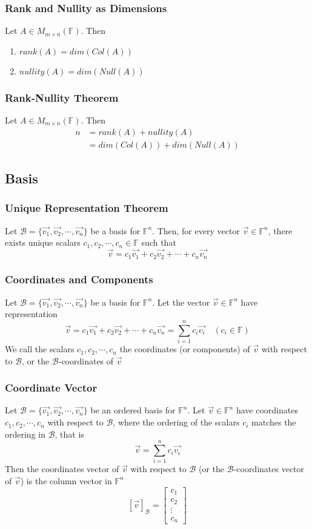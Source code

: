 \documentclass[12pt, letterpaper]{article}
\begin{document}
\subsubsection{Rank and Nullity as Dimensions}
Let $A\in M_{m\times n}(\mathbb{F})$. Then 
\begin{enumerate}
    \item $rank(A)=dim(Col(A))$
    \item $nullity(A)=dim(Null(A))$
\end{enumerate}
\subsubsection{Rank-Nullity Theorem}
Let $A\in M_{m\times n}(\mathbb{F})$. Then 
\begin{align*}
    n &= rank(A) + nullity(A) \\   
      &= dim(Col(A)) + dim(Null(A))
\end{align*}
\subsection{Basis}
\subsubsection{Unique Representation Theorem}
Let $\mathcal{B} = \{\vec{v_1}, \vec{v_2}, \cdots, \vec{v_n}\}$ be a basis for $\mathbb{F}^n$. Then, for every vector 
$\vec{v}\in\mathbb{F}^n$, there exists unique scalars $c_1, c_2,\cdots,c_n\in\mathbb{F}$ such that 
\[\vec{v}=c_1\vec{v_1}+c_2\vec{v_2}+\cdots+c_n\vec{v_n}\]
\subsubsection{Coordinates and Components}
Let $\mathcal{B} = \{\vec{v_1}, \vec{v_2}, \cdots, \vec{v_n}\}$ be a basis for $\mathbb{F}^n$. Let the vector $\vec{v}\in\mathbb{F}^n$
have representation
\[\vec{v}=c_1\vec{v_1}+c_2\vec{v_2}+\cdots+c_n\vec{v_n}=\sum_{i=1}^{n}c_i\vec{v_i}\quad(c_i\in\mathbb{F})\]
We call the scalars $c_1,c_2,\cdots,c_n$ the coordinates (or components) of $\vec{v}$ with respect to $\mathcal{B}$, or the $\mathcal{B}$-coordinates of $\vec{v}$
\subsubsection{Coordinate Vector}
Let $\mathcal{B} = \{\vec{v_1}, \vec{v_2}, \cdots, \vec{v_n}\}$ be an ordered basis for $\mathbb{F}^n$. Let $\vec{v}\in\mathbb{F}^n$ have 
coordinates $c_1,c_2,\cdots,c_n$ with respect to $\mathcal{B}$, where the ordering of the scalars $c_i$ matches the ordering in $\mathcal{B}$, that is 
\[\vec{v} = \sum_{i=1}^{n}c_i\vec{v_i}\]
Then the coordinates vector of $\vec{v}$ with respect to $\mathcal{B}$ (or the $\mathcal{B}$-coordinates vector of $\vec{v}$) is the column vector in $\mathbb{F}^n$
\[[\vec{v}]_\mathcal{B} = \begin{bmatrix} c_1\\c_2\\\vdots\\c_n \end{bmatrix}\]
\end{document}
